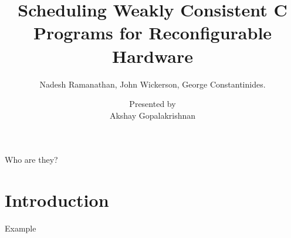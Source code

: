 \documentclass[notes xcolor=dvipsnames]{beamer}
\title{Scheduling Weakly Consistent C Programs for Reconfigurable Hardware}
\subtitle{Nadesh Ramanathan, John Wickerson, George Constantinides.}
\author{Presented by \\ Akshay Gopalakrishnan}
\begin{document}
    
    \begin{frame}

        \maketitle

    \end{frame}

    \begin{frame}{Who are they?}

    \end{frame}

    \section{Introduction}
    \begin{frame}{Example}

        \begin{columns}
            
            \begin{column}{0.5\textwidth}
                \begin{figure}
                \end{figure}
                
            \end{column}

            \begin{column}{0.5\textwidth}

                \begin{figure}
                \end{figure}

                \begin{figure}
                \end{figure}
                

\end{column}
\end{columns}
\end{frame}
\end{document}
